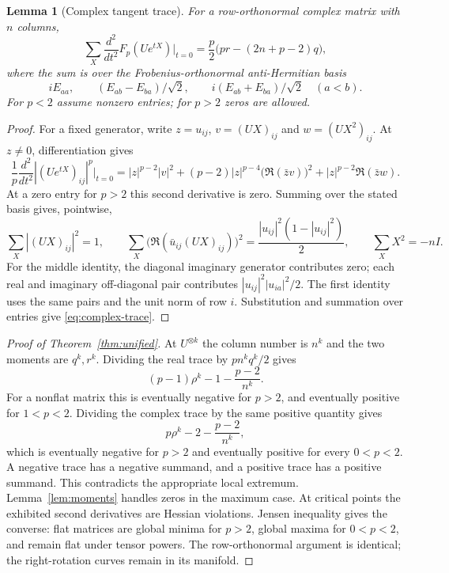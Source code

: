 \documentclass[11pt]{article}
\newtheorem{lemma}[theorem]{Lemma}
\begin{document}
\begin{lemma}[Complex tangent trace]\label{lem:complex-trace}
For a row-orthonormal complex matrix with $n$ columns,
\begin{equation}\label{eq:complex-trace}
 \sum_X\frac{d^2}{dt^2}F_p(Ue^{tX})\bigg|_{t=0}
 =\frac p2\big(pr-(2n+p-2)q\big),
\end{equation}
where the sum is over the Frobenius-orthonormal anti-Hermitian basis
\[
 iE_{aa},\qquad (E_{ab}-E_{ba})/\sqrt2,\qquad
 i(E_{ab}+E_{ba})/\sqrt2\quad(a<b).
\]
For $p<2$ assume nonzero entries; for $p>2$ zeros are allowed.
\end{lemma}
\begin{proof}
For a fixed generator, write $z=u_{ij}$, $v=(UX)_{ij}$ and
$w=(UX^2)_{ij}$. At $z\ne0$, differentiation gives
\[
 \frac1p\frac{d^2}{dt^2}|(Ue^{tX})_{ij}|^p\bigg|_{t=0}
 =|z|^{p-2}|v|^2+(p-2)|z|^{p-4}
       \big(\Re(\bar zv)\big)^2+|z|^{p-2}\Re(\bar zw).
\]
At a zero entry for $p>2$ this second derivative is zero.
Summing over the stated basis gives, pointwise,
\[
 \sum_X |(UX)_{ij}|^2=1,\qquad
 \sum_X\big(\Re(\bar u_{ij}(UX)_{ij})\big)^2
       =\frac{|u_{ij}|^2(1-|u_{ij}|^2)}2,
 \qquad \sum_X X^2=-nI.
\]
For the middle identity, the diagonal imaginary generator contributes
zero; each real and imaginary off-diagonal pair contributes
$|u_{ij}|^2|u_{ia}|^2/2$. The first identity uses the same pairs and
the unit norm of row $i$. Substitution and summation over entries
give \eqref{eq:complex-trace}.
\end{proof}

\begin{proof}[Proof of Theorem~\ref{thm:unified}]
At $U^{\otimes k}$ the column number is $n^k$ and the two moments are
$q^k,r^k$. Dividing the real trace by $pn^kq^k/2$ gives
\[
 (p-1)\rho^k-1-\frac{p-2}{n^k}.
\]
For a nonflat matrix this is eventually negative for $p>2$, and
eventually positive for $1<p<2$. Dividing the complex trace by the
same positive quantity gives
\[
 p\rho^k-2-\frac{p-2}{n^k},
\]
which is eventually negative for $p>2$ and eventually positive for
every $0<p<2$. A negative trace has a negative summand, and a positive
trace has a positive summand. This contradicts the appropriate local
extremum. Lemma~\ref{lem:moments} handles zeros in the maximum case.
At critical points the exhibited second derivatives are Hessian
violations. Jensen inequality gives the converse: flat matrices are
global minima for $p>2$, global maxima for $0<p<2$, and remain flat
under tensor powers. The row-orthonormal argument is identical; the
right-rotation curves remain in its manifold.
\end{proof}
\end{document}
